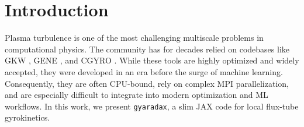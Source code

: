 \documentclass{article}
\theoremstyle{plain}
\theoremstyle{definition}
\theoremstyle{remark}
\begin{document}

\section{Introduction}

Plasma turbulence is one of the most challenging multiscale problems in computational physics. The community has for decades relied on codebases like GKW \cite{PEETERS_GKW_2009}, GENE \cite{jenko2000electron}, and CGYRO \cite{CANDY201673}. While these tools are highly optimized and widely accepted, they were developed in an era before the surge of machine learning.
%
Consequently, they are often CPU-bound, rely on complex MPI parallelization, and are especially difficult to integrate into modern optimization and ML workflows.
In this work, we present \texttt{gyaradax}, a slim JAX code for local flux-tube gyrokinetics.
\end{document}
